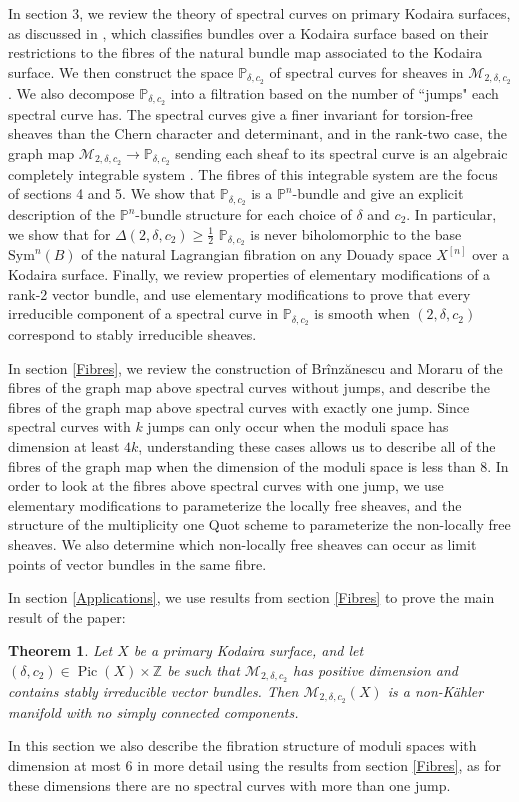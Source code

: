 \documentclass{article}[12pt]
\newtheorem{theorem}{Theorem}[section]
\theoremstyle{definition}
\theoremstyle{remark}
\newcommand \Z{\mathbb Z}
\numberwithin{equation}{section}
\newcommand \mc{\mathcal}
\newcommand \mb{\mathbb}
\DeclareMathOperator{\Pic}{Pic}
\begin{document}
In section 3, we review the theory of spectral curves on primary Kodaira surfaces, as discussed in \cite{BrMor,BrMor2,BrMoFM}, which classifies bundles over a Kodaira surface based on their restrictions to the fibres of the natural bundle map associated to the Kodaira surface. We then construct the space $\mb{P}_{\delta,c_2}$ of spectral curves for sheaves in $\mc{M}_{2,\delta,c_2}$. We also decompose $\mb{P}_{\delta,c_2}$ into a filtration based on the number of ``jumps" each spectral curve has. The spectral curves give a finer invariant for torsion-free sheaves than the Chern character and determinant, and in the rank-two case, the graph map $\mc{M}_{2,\delta,c_2} \to \mb{P}_{\delta,c_2}$ sending each sheaf to its spectral curve is an algebraic completely integrable system \cite{BrMor}. The fibres of this integrable system are the focus of sections 4 and 5. We show that $\mb{P}_{\delta,c_2}$ is a $\mb{P}^n$-bundle and give an explicit description of the $\mb{P}^n$-bundle structure for each choice of $\delta$ and $c_2$. In particular, we show that for $\Delta(2,\delta,c_2)\geq \frac{1}{2}$ $\mb{P}_{\delta,c_2}$ is never biholomorphic to the base $\mathrm{Sym}^n(B)$ of the natural Lagrangian fibration on any Douady space $X^{[n]}$ over a Kodaira surface. Finally, we review properties of elementary modifications of a rank-2 vector bundle, and use elementary modifications to prove that every irreducible component of a spectral curve in $\mb{P}_{\delta, c_2}$ is smooth when $(2,\delta,c_2)$ correspond to stably irreducible sheaves.

In section \ref{Fibres}, we review the construction of Br\^inz\u anescu and Moraru \cite{BrMoFM} of the fibres of the graph map above spectral curves without jumps, and describe the fibres of the graph map above spectral curves with exactly one jump. Since spectral curves with $k$ jumps can only occur when the moduli space has dimension at least $4k$, understanding these cases allows us to describe all of the fibres of the graph map when the dimension of the moduli space is less than 8. In order to look at the fibres above spectral curves with one jump, we use elementary modifications to parameterize the locally free sheaves, and the structure of the multiplicity one Quot scheme to parameterize the non-locally free sheaves. We also determine which non-locally free sheaves can occur as limit points of vector bundles in the same fibre.

In section \ref{Applications}, we use results from section \ref{Fibres} to prove the main result of the paper: 
\begin{theorem}
	Let $X$ be a primary Kodaira surface, and let $(\delta,c_2) \in \Pic(X)\times \Z$ be such that $\mc{M}_{2,\delta,c_2}$ has positive dimension and contains stably irreducible vector bundles. Then $\mc{M}_{2,\delta,c_2}(X)$ is a non-K\"ahler manifold with no simply connected components.
\end{theorem}
  In this section we also describe the fibration structure of moduli spaces with dimension at most 6 in more detail using the results from section \ref{Fibres}, as for these dimensions there are no spectral curves with more than one jump.
  
\end{document}
